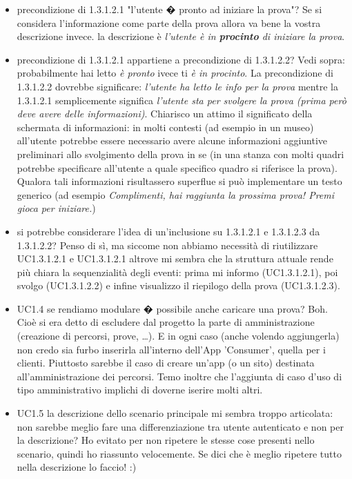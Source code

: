 \documentclass[11pt,a4paper]{article}
\begin{document}
\begin{itemize}
		\item precondizione di 1.3.1.2.1 "l'utente � pronto ad iniziare la prova"? Se si considera l'informazione come parte della prova allora va bene la vostra descrizione invece.
			\subitem la descrizione è \textit{l'utente è in \textbf{procinto} di iniziare la prova}.
		\item precondizione di 1.3.1.2.1 appartiene a precondizione di 1.3.1.2.2?
			\subitem Vedi sopra: probabilmente hai letto \textit{è pronto} ivece ti \textit{è in procinto}. La precondizione di 1.3.1.2.2 dovrebbe significare: \textit{l'utente ha letto le info per la prova} mentre la 1.3.1.2.1 semplicemente significa \textit{l'utente sta per svolgere la prova (prima però deve avere delle informazioni)}.
			Chiarisco un attimo il significato della schermata di informazioni: in molti contesti (ad esempio in un museo) all'utente potrebbe essere necessario avere alcune informazioni aggiuntive preliminari allo svolgimento della prova in se (in una stanza con molti quadri potrebbe specificare all'utente a quale specifico quadro si riferisce la prova). Qualora tali informazioni risultassero superflue si può implementare un testo generico (ad esempio \textit{Complimenti, hai raggiunta la prossima prova! Premi gioca per iniziare.})
		\item si potrebbe considerare l'idea di un'inclusione su 1.3.1.2.1 e 1.3.1.2.3 da 1.3.1.2.2?
			\subitem Penso di sì, ma siccome non abbiamo necessità di riutilizzare UC1.3.1.2.1 e UC1.3.1.2.1 altrove mi sembra che la struttura attuale rende più chiara la sequenzialità degli eventi: prima mi informo (UC1.3.1.2.1), poi svolgo (UC1.3.1.2.2) e infine visualizzo il riepilogo della prova (UC1.3.1.2.3).
		\item UC1.4 se rendiamo modulare � possibile anche caricare una prova?
			\subitem Boh. Cioè si era detto di escludere dal progetto la parte di amministrazione (creazione di percorsi, prove, …). E in ogni caso (anche volendo aggiungerla) non credo sia furbo inserirla all'interno dell'App 'Consumer', quella per i clienti. Piuttosto sarebbe il caso di creare un'app (o un sito) destinata all'amministrazione dei percorsi. Temo inoltre che l'aggiunta di caso d'uso di tipo amministrativo implichi di doverne iserire molti altri.
		\item UC1.5 la descrizione dello scenario principale mi sembra troppo articolata: non sarebbe meglio fare una differenziazione tra utente autenticato e non per la descrizione?
			\subitem Ho evitato per non ripetere le stesse cose presenti nello scenario, quindi ho riassunto velocemente. Se dici che è meglio ripetere tutto nella descrizione lo faccio! :)

\end{itemize}
\end{document}
